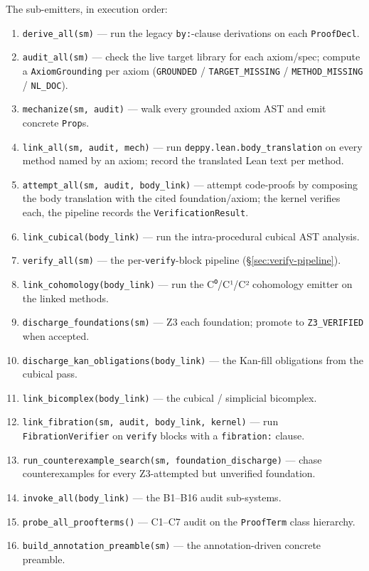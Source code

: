 The sub-emitters, in execution order:

\begin{enumerate}[leftmargin=1.7em]
  \item \texttt{derive\_all(sm)} --- run the legacy \texttt{by:}-clause
    derivations on each \texttt{ProofDecl}.
  \item \texttt{audit\_all(sm)} --- check the live target library
    for each axiom/spec; compute a \texttt{AxiomGrounding} per
    axiom (\texttt{GROUNDED} / \texttt{TARGET\_MISSING} /
    \texttt{METHOD\_MISSING} / \texttt{NL\_DOC}).
  \item \texttt{mechanize(sm, audit)} --- walk every grounded
    axiom AST and emit concrete \Lean{} \texttt{Prop}s.
  \item \texttt{link\_all(sm, audit, mech)} --- run
    \texttt{deppy.lean.body\_translation} on every method named
    by an axiom; record the translated Lean text per method.
  \item \texttt{attempt\_all(sm, audit, body\_link)} --- attempt
    code-proofs by composing the body translation with the
    cited foundation/axiom; the kernel verifies each, the
    pipeline records the \texttt{VerificationResult}.
  \item \texttt{link\_cubical(body\_link)} --- run the
    intra-procedural cubical AST analysis.
  \item \texttt{verify\_all(sm)} --- the per-\texttt{verify}-block
    pipeline (\S\ref{sec:verify-pipeline}).
  \item \texttt{link\_cohomology(body\_link)} --- run the C⁰/C¹/C²
    cohomology emitter on the linked methods.
  \item \texttt{discharge\_foundations(sm)} --- Z3 each foundation;
    promote to \texttt{Z3\_VERIFIED} when accepted.
  \item \texttt{discharge\_kan\_obligations(body\_link)} --- the
    Kan-fill obligations from the cubical pass.
  \item \texttt{link\_bicomplex(body\_link)} --- the cubical /
    simplicial bicomplex.
  \item \texttt{link\_fibration(sm, audit, body\_link, kernel)}
    --- run \texttt{FibrationVerifier} on
    \texttt{verify} blocks with a \texttt{fibration:} clause.
  \item \texttt{run\_counterexample\_search(sm, foundation\_discharge)}
    --- chase counterexamples for every Z3-attempted but
    unverified foundation.
  \item \texttt{invoke\_all(body\_link)} --- the B1--B16 audit
    sub-systems.
  \item \texttt{probe\_all\_proofterms()} --- C1--C7 audit on the
    \texttt{ProofTerm} class hierarchy.
  \item \texttt{build\_annotation\_preamble(sm)} --- the
    annotation-driven concrete preamble.
\end{enumerate}


